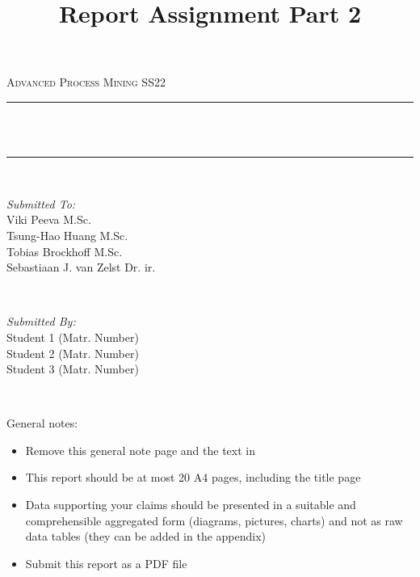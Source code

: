 \documentclass[12pt]{report}
\title{Report Assignment Part 2}
\author{}
\date{}
\makeatletter
\let\thetitle\@title
\makeatother
\begin{document}

\begin{titlepage}
	\centering
    \vspace*{0.5 cm}
  \begin{center}    
    \textsc{\Large Advanced Process Mining SS22}\\[2.0 cm]	
  \end{center}
	\rule{\linewidth}{0.2 mm} \\[0.4 cm]
	{ \huge \bfseries \thetitle}\\
	\rule{\linewidth}{0.2 mm} \\[1.5 cm]
	
  \begin{minipage}{0.48\textwidth}
    \begin{flushleft} \large
      \emph{Submitted To:}\\
      Viki Peeva M.Sc.\\
      Tsung-Hao Huang M.Sc. \\
      Tobias Brockhoff M.Sc.\\
      Sebastiaan J. van Zelst Dr. ir.
    \end{flushleft}
  \end{minipage}~
  \begin{minipage}{0.48\textwidth}
    \begin{flushright} \large
			\emph{Submitted By:} \\
      Student 1 (Matr. Number) \\
      Student 2 (Matr. Number) \\
      Student 3 (Matr. Number) 
		\end{flushright}
	\end{minipage}\\[2 cm]
\end{titlepage}



General notes:
\begin{itemize}
  \item Remove this general note page and the text in \textlangle \textrangle
  \item This report should be at most 20 A4 pages, including the title page 
  \item	Data supporting your claims should be presented in a suitable and comprehensible aggregated form (diagrams, pictures, charts) and not as raw data tables (they can be added in the appendix)
  \item Submit this report as a PDF file
\end{itemize}
\newpage
\end{document}

